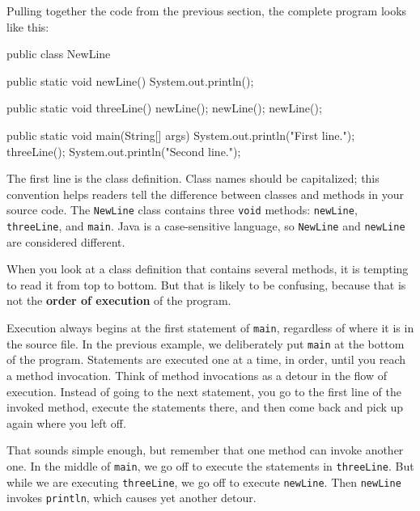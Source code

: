 \documentclass[12pt]{book}
\makeatletter
\theoremstyle{exercise}
\newcommand{\java}[1]{\verb"#1"}
\renewcommand\subsection{\@startsection{subsection}{2}{\z@}%
    {-3.25ex\@plus -1ex \@minus -.2ex}%
    {0.3ex \@plus .2ex}%
    {\normalfont\large\bfseries}}
\newcommand{\java}[1]{\lstinline{#1}} %
\makeatother
\begin{document}
Pulling together the code from the previous section, the complete program looks like this:

\begin{code}
public class NewLine {

    public static void newLine() {
        System.out.println();
    }

    public static void threeLine() {
        newLine();
        newLine();
        newLine();
    }

    public static void main(String[] args) {
        System.out.println("First line.");
        threeLine();
        System.out.println("Second line.");
    }
}
\end{code}


The first line is the class definition.
Class names should be capitalized; this convention helps readers tell the difference between classes and methods in your source code.
The \java{NewLine} class contains three \java{void} methods: \java{newLine}, \java{threeLine}, and \java{main}.
Java is a case-sensitive language, so \java{NewLine} and \java{newLine} are considered different.



When you look at a class definition that contains several methods, it is tempting to read it from top to bottom.
But that is likely to be confusing, because that is not the {\bf order of execution} of the program.

Execution always begins at the first statement of \java{main}, regardless of where it is in the source file.
In the previous example, we deliberately put \java{main} at the bottom of the program.
Statements are executed one at a time, in order, until you reach a method invocation.
Think of method invocations as a detour in the flow of execution.
Instead of going to the next statement, you go to the first line of the invoked method, execute the statements there, and then come back and pick up again where you left off.

That sounds simple enough, but remember that one method can invoke another one.
In the middle of \java{main}, we go off to execute the statements in \java{threeLine}.
But while we are executing \java{threeLine}, we go off to execute \java{newLine}.
Then \java{newLine} invokes \java{println}, which causes yet another detour.
\end{document}
